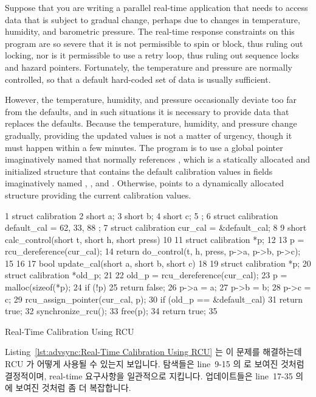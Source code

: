 Suppose that you are writing a parallel real-time application that needs
to access
data that is subject to gradual change, perhaps due to changes in
temperature, humidity, and barometric pressure.
The real-time response constraints on this program are so severe that
it is not permissible to spin or block, thus ruling out locking,
nor is it permissible to use a retry loop, thus ruling out sequence locks
and hazard pointers.
Fortunately, the temperature and pressure are normally controlled,
so that a default hard-coded set of data is usually sufficient.

However, the temperature, humidity, and pressure occasionally deviate too far
from the defaults, and in such situations it is necessary to provide
data that replaces the defaults.
Because the temperature, humidity, and pressure change gradually,
providing the updated values is not a matter of urgency, though
it must happen within a few minutes.
The program is to use a global pointer imaginatively named 
that normally references , which is a statically allocated
and initialized structure that contains the default calibration values
in fields imaginatively named , , and .
Otherwise,  points to a dynamically allocated
structure providing the current calibration values.
\fi

\begin{listing}[tb]
{ \scriptsize
\begin{verbbox}
 1 struct calibration {
 2   short a;
 3   short b;
 4   short c;
 5 };
 6 struct calibration default_cal = { 62, 33, 88 };
 7 struct calibration cur_cal = &default_cal;
 8
 9 short calc_control(short t, short h, short press)
10 {
11   struct calibration *p;
12
13   p = rcu_dereference(cur_cal);
14   return do_control(t, h, press, p->a, p->b, p->c);
15 }
16
17 bool update_cal(short a, short b, short c)
18 {
19   struct calibration *p;
20   struct calibration *old_p;
21
22   old_p = rcu_dereference(cur_cal);
23   p = malloc(sizeof(*p);
24   if (!p)
25     return false;
26   p->a = a;
27   p->b = b;
28   p->c = c;
29   rcu_assign_pointer(cur_cal, p);
30   if (old_p == &default_cal)
31     return true;
32   synchronize_rcu();
33   free(p);
34   return true;
35 }
\end{verbbox}
}
\centering
\theverbbox
\caption{Real-Time Calibration Using RCU}
\label{lst:advsync:Real-Time Calibration Using RCU}
\end{listing}

Listing~\ref{lst:advsync:Real-Time Calibration Using RCU}
는 이 문제를 해결하는데 RCU 가 어떻게 사용될 수 있는지 보입니다.
탐색들은 line~9-15 의  로 보여진 것처럼 결정적이며,
real-time 요구사항을 일관적으로 지킵니다.
업데이트들은 line~17-35 의  에 보여진 것처럼 좀 더 복잡합니다.
\iffalse

